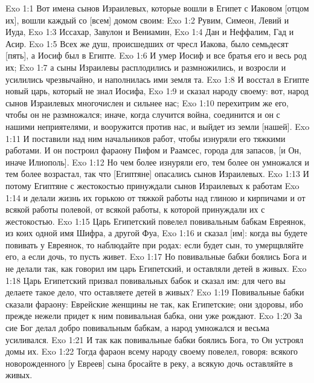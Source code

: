 \vs Exo 1:1 Вот имена сынов Израилевых, которые вошли в Египет с Иаковом [отцом их], вошли каждый со [всем] домом своим:
\vs Exo 1:2 Рувим, Симеон, Левий и Иуда,
\vs Exo 1:3 Иссахар, Завулон и Вениамин,
\vs Exo 1:4 Дан и Неффалим, Гад и Асир.
\vs Exo 1:5 Всех же душ, происшедших от чресл Иакова, было семьдесят [пять], а Иосиф был  в Египте.
\vs Exo 1:6 И умер Иосиф и все братья его и весь род их;
\vs Exo 1:7 а сыны Израилевы расплодились и размножились, и возросли и усилились чрезвычайно, и наполнилась ими земля та.
\rsbpar\vs Exo 1:8 И восстал в Египте новый царь, который не знал Иосифа,
\vs Exo 1:9 и сказал народу своему: вот, народ сынов Израилевых многочислен и сильнее нас;
\vs Exo 1:10 перехитрим же его, чтобы он не размножался; иначе, когда случится война, соединится и он с нашими неприятелями, и вооружится против нас, и выйдет из земли [нашей].
\vs Exo 1:11 И поставили над ним начальников работ, чтобы изнуряли его тяжкими работами. И он построил фараону Пифом и Раамсес, города для запасов, [и Он, иначе Илиополь].
\vs Exo 1:12 Но чем более изнуряли его, тем более он умножался и тем более возрастал, так что [Египтяне] опасались сынов Израилевых.
\vs Exo 1:13 И потому Египтяне с жестокостью принуждали сынов Израилевых к работам
\vs Exo 1:14 и делали жизнь их горькою от тяжкой работы над глиною и кирпичами и от всякой работы полевой, от всякой работы, к которой принуждали их с жестокостью.
\rsbpar\vs Exo 1:15 Царь Египетский повелел повивальным бабкам Евреянок, из коих одной имя Шифра, а другой Фуа,
\vs Exo 1:16 и сказал [им]: когда вы будете повивать у Евреянок, то наблюдайте при родах: если будет сын, то умерщвляйте его, а если дочь, то пусть живет.
\vs Exo 1:17 Но повивальные бабки боялись Бога и не делали так, как говорил им царь Египетский, и оставляли детей в живых.
\vs Exo 1:18 Царь Египетский призвал повивальных бабок и сказал им: для чего вы делаете такое дело, что оставляете детей в живых?
\vs Exo 1:19 Повивальные бабки сказали фараону: Еврейские женщины не так, как Египетские; они здоровы, ибо прежде нежели придет к ним повивальная бабка, они уже рождают.
\vs Exo 1:20 За сие Бог делал добро повивальным бабкам, а народ умножался и весьма усиливался.
\vs Exo 1:21 И так как повивальные бабки боялись Бога, то Он устроял домы их.
\vs Exo 1:22 Тогда фараон всему народу своему повелел, говоря: всякого новорожденного [у Евреев] сына бросайте в реку, а всякую дочь оставляйте в живых.
